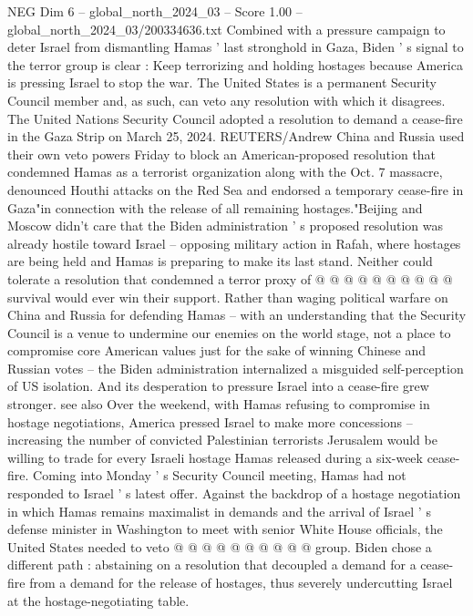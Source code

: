 \begin{textsample}{NEG Dim 6 – global\_north\_2024\_03 – Score 1.00 – global\_north\_2024\_03/200334636.txt}  \label{ex:f6_neg_403}
Combined with a pressure campaign to deter Israel from dismantling Hamas ' last stronghold in Gaza, Biden ' s signal to the terror group is clear : Keep terrorizing and holding hostages because America is pressing Israel to stop the war.
The United States is a permanent Security Council member and, as such, can veto any resolution with which it disagrees.
The United Nations Security Council adopted a resolution to demand a cease-fire in the Gaza Strip on March 25, 2024.
REUTERS/Andrew China and Russia used their own veto powers Friday to block an American-proposed resolution that condemned Hamas as a terrorist organization along with the Oct. 7 massacre, denounced Houthi attacks on the Red Sea and endorsed a temporary cease-fire in Gaza"in connection with the release of all remaining hostages."Beijing and Moscow didn't care that the Biden administration ' s proposed resolution was already hostile toward Israel -- opposing military action in Rafah, where hostages are being held and Hamas is preparing to make its last stand.
Neither could tolerate a resolution that condemned a terror proxy of @ @ @ @ @ @ @ @ @ @ survival would ever win their support.
Rather than waging political warfare on China and Russia for defending Hamas -- with an understanding that the Security Council is a venue to undermine our enemies on the world stage, not a place to compromise core American values just for the sake of winning Chinese and Russian votes -- the Biden administration internalized a misguided self-perception of US isolation.
And its desperation to pressure Israel into a cease-fire grew stronger. see also Over the weekend, with Hamas refusing to compromise in hostage negotiations, America pressed Israel to make more concessions -- increasing the number of convicted Palestinian terrorists Jerusalem would be willing to trade for every Israeli hostage Hamas released during a six-week cease-fire.
Coming into Monday ' s Security Council meeting, Hamas had not responded to Israel ' s latest offer.
Against the backdrop of a hostage negotiation in which Hamas remains maximalist in demands and the arrival of Israel ' s defense minister in Washington to meet with senior White House officials, the United States needed to veto @ @ @ @ @ @ @ @ @ @ group.
Biden chose a different path : abstaining on a resolution that decoupled a demand for a cease-fire from a demand for the release of hostages, thus severely undercutting Israel at the hostage-negotiating table.

\end{textsample}

